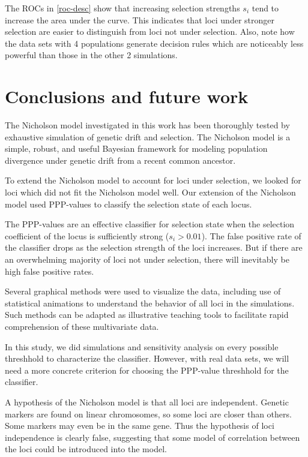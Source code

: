 \documentclass[a4paper,12pt]{article}
\begin{document}

The ROCs in \autoref{roc-desc} show that increasing selection
strengths $s_i$ tend to increase the area under the curve. This
indicates that loci under stronger selection are easier to distinguish
from loci not under selection. Also, note how the data sets with 4
populations generate decision rules which are noticeably less powerful
than those in the other 2 simulations.

\section{Conclusions and future work}

The Nicholson model investigated in this work has been thoroughly
tested by exhaustive simulation of genetic drift and selection. The
Nicholson model is a simple, robust, and useful Bayesian framework for
modeling population divergence under genetic drift from a recent
common ancestor.

To extend the Nicholson model to account for loci under selection, we
looked for loci which did not fit the Nicholson model well. Our
extension of the Nicholson model used PPP-values to classify the
selection state of each locus.

The PPP-values are an effective classifier for selection state when
the selection coefficient of the locus is sufficiently strong
($s_i>0.01$). The false positive rate of the classifier drops as the
selection strength of the loci increases. But if there are an
overwhelming majority of loci not under selection, there will
inevitably be high false positive rates.

Several graphical methods were used to visualize the data, including
use of statistical animations to understand the behavior of all loci
in the simulations. Such methods can be adapted as illustrative
teaching tools to facilitate rapid comprehension of these multivariate
data.

In this study, we did simulations and sensitivity analysis on every
possible threshhold to characterize the classifier. However, with real
data sets, we will need a more concrete criterion for choosing the
PPP-value threshhold for the classifier.

A hypothesis of the Nicholson model is that all loci are
independent. Genetic markers are found on linear chromosomes, so some
loci are closer than others. Some markers may even be in the same
gene. Thus the hypothesis of loci independence is clearly false,
suggesting that some model of correlation between the loci could be
introduced into the model.
\end{document}

